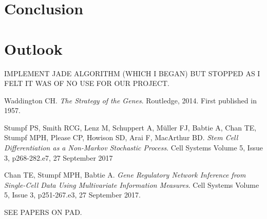 \documentclass[journal, a4paper]{IEEEtran}
\begin{document}
\section{Conclusion}

\section{Outlook}

IMPLEMENT JADE ALGORITHM (WHICH I BEGAN) BUT STOPPED AS I FELT IT WAS OF NO USE FOR OUR PROJECT. 

\begin{thebibliography}{99}
	
	Waddington CH. \textit{The Strategy of the Genes}. Routledge, 2014. First published in 1957. 
	
	Stumpf PS, Smith RCG, Lenz M, Schuppert A, M{\"u}ller FJ, Babtie A,
	Chan TE, Stumpf MPH, Please CP, Howison SD, Arai F, MacArthur BD. \textit{Stem Cell Differentiation as a Non-Markov Stochastic Process}. Cell Systems Volume 5, Issue 3, p268-282.e7, 27 September 2017 
	
	Chan TE, Stumpf MPH, Babtie A. \textit{Gene Regulatory Network Inference from Single-Cell Data Using Multivariate Information Measures}. Cell Systems Volume 5, Issue 3, p251-267.e3, 27 September 2017.
	
	
	SEE PAPERS ON PAD.
	
	
\end{thebibliography}

\end{document}
